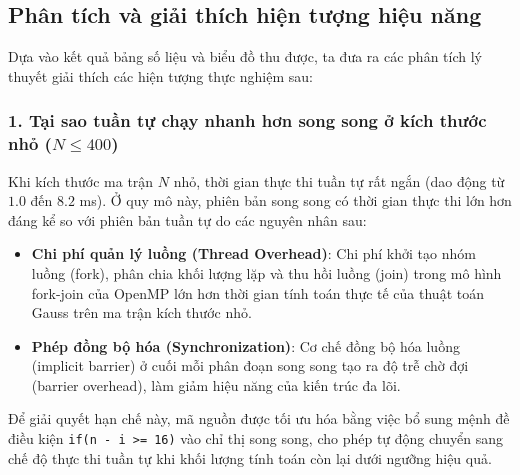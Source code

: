 \subsection{Phân tích và giải thích hiện tượng hiệu năng}

Dựa vào kết quả bảng số liệu và biểu đồ thu được, ta đưa ra các phân tích lý thuyết giải thích các hiện tượng thực nghiệm sau:

\subsubsection{1. Tại sao tuần tự chạy nhanh hơn song song ở kích thước nhỏ ($N \le 400$)}
Khi kích thước ma trận $N$ nhỏ, thời gian thực thi tuần tự rất ngắn (dao động từ $1.0$ đến $8.2$ ms). Ở quy mô này, phiên bản song song có thời gian thực thi lớn hơn đáng kể so với phiên bản tuần tự do các nguyên nhân sau:
\begin{itemize}
  \item \textbf{Chi phí quản lý luồng (Thread Overhead)}: Chi phí khởi tạo nhóm luồng (fork), phân chia khối lượng lặp và thu hồi luồng (join) trong mô hình fork-join của OpenMP lớn hơn thời gian tính toán thực tế của thuật toán Gauss trên ma trận kích thước nhỏ.
  \item \textbf{Phép đồng bộ hóa (Synchronization)}: Cơ chế đồng bộ hóa luồng (implicit barrier) ở cuối mỗi phân đoạn song song tạo ra độ trễ chờ đợi (barrier overhead), làm giảm hiệu năng của kiến trúc đa lõi.
\end{itemize}
Để giải quyết hạn chế này, mã nguồn được tối ưu hóa bằng việc bổ sung mệnh đề điều kiện \texttt{if(n - i >= 16)} vào chỉ thị song song, cho phép tự động chuyển sang chế độ thực thi tuần tự khi khối lượng tính toán còn lại dưới ngưỡng hiệu quả.

